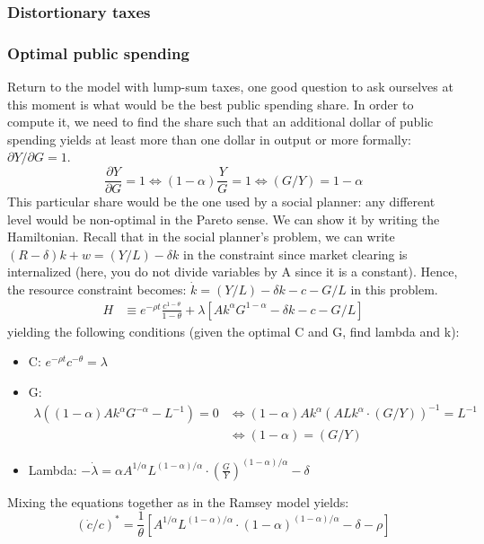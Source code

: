 \documentclass[12pt]{report}
\begin{document}
\subsubsection{Distortionary taxes}



\subsubsection{Optimal public spending}

Return to the model with lump-sum taxes, one good question to ask ourselves at this moment is what would be the best public spending share. In order to compute it, we need to find the share such that an additional dollar of public spending yields at least more than one dollar in output or more formally: $\partial Y/\partial G = 1$. $$\frac{\partial Y}{\partial G} = 1 \Leftrightarrow (1 - \alpha) \frac{Y}{G} = 1 \Leftrightarrow (G/Y) = 1 - \alpha $$ This particular share would be the one used by a social planner: any different level would be non-optimal in the Pareto sense. We can show it by writing the Hamiltonian. Recall that in the social planner's problem, we can write $(R - \delta)k + w = (Y/L) - \delta k$ in the constraint since market clearing is internalized (here, you do not divide variables by A since it is a constant). Hence, the resource constraint becomes: $\dot k = (Y/L) - \delta k - c - G/L$ in this problem. \begin{align*}
 H & \equiv e^{-\rho t} \frac{c^{1-\theta}}{1-\theta} + \lambda\left[ Ak^\alpha G^{1-\alpha} - \delta k - c - G/L\right]
\end{align*} yielding the following conditions (given the optimal C and G, find lambda and k):\begin{itemize}
\item C: $e^{-\rho t} c^{-\theta} = \lambda $
\item G: \begin{align*}
\lambda \left( (1-\alpha) Ak^\alpha G^{-\alpha} - L^{-1} \right) = 0 & \Leftrightarrow (1-\alpha) A k^\alpha \left( ALk^{\alpha}\cdot (G/Y) \right)^{-1} = L^{-1} \\
& \Leftrightarrow (1-\alpha) = (G/Y)
\end{align*}
\item Lambda: $-\dot\lambda = \alpha A^{1/\alpha}L^{(1-\alpha)/\alpha} \cdot \left(\frac{G}{Y}\right)^{(1-\alpha)/\alpha} - \delta $
\end{itemize}
Mixing the equations together as in the Ramsey model yields: $$(\dot c/c)^* = \frac{1}{\theta}\left[ A^{1/\alpha}L^{(1-\alpha)/\alpha} \cdot \left(1-\alpha\right)^{(1-\alpha)/\alpha} - \delta - \rho \right] $$
\end{document}
